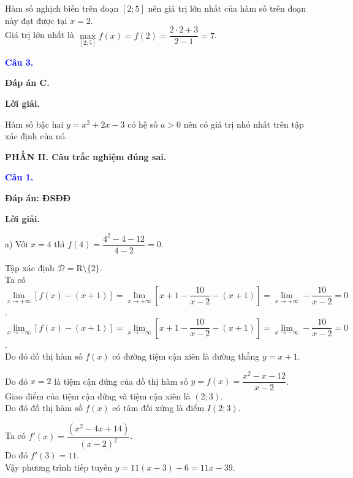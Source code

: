 \documentclass[12pt,a4paper]{article}
\begin{document}
		Hàm số nghịch biến trên đoạn $[2;5]$ nên giá trị lớn nhất của hàm số trên đoạn này đạt được tại $x=2$.\\

		Giá trị lớn nhất là $\max\limits_{[2;5]} f(x)=f(2)=\dfrac{2\cdot 2+3}{2-1}=7$.

\medskip
\noindent\textcolor{blue}{\textbf{Câu 3.}}

\noindent \textbf{Đáp án C.}

\noindent\textbf{Lời giải.}

Hàm số bậc hai $y=x^2+2x-3$ có hệ số $a>0$ nên có giá trị nhỏ nhất trên tập xác định của nó.

\medskip
\noindent\textbf{PHẦN II. Câu trắc nghiệm đúng sai.}

\medskip

\noindent\textcolor{blue}{\textbf{Câu 1.}}

\noindent \textbf{Đáp án: ĐSĐĐ}

\noindent\textbf{Lời giải.}

a)  Với $x=4$ thì $f(4)=\dfrac{4^2-4-12}{4-2}=0$.

			Tập xác định $\mathscr{D}=\mathrm{R}\setminus \{2\}$.\\

			Ta có $\lim\limits_{x\to+\infty} \left[f(x)-(x+1)\right]=\lim\limits_{x\to+\infty} \left[x+1-\dfrac{10}{x-2}-(x+1)\right]=\lim\limits_{x\to+\infty}-\dfrac{10}{x-2}=0$.\\
$\lim\limits_{x\to-\infty} \left[f(x)-(x+1)\right]=\lim\limits_{x\to-\infty} \left[x+1-\dfrac{10}{x-2}-(x+1)\right]=\lim\limits_{x\to-\infty}-\dfrac{10}{x-2}=0$.\\

			Do đó đồ thị hàm số $f(x)$ có đường tiệm cận xiên là đường thẳng $y=x+1$.

			Do đó $x=2$ là tiệm cận đứng của đồ thị hàm số $y=f(x)=\dfrac{x^2-x-12}{x-2}$.\\

			Giao điểm của tiệm cận đứng và tiệm cận xiên là $(2;3)$.\\
Do đó đồ thị hàm số $f(x)$ có tâm đối xứng là điểm $I(2; 3)$.

			Ta có $f'(x)=\dfrac{(x^2-4x+14)}{(x-2)^2}$.\\

			Do đó $f'(3)=11$.\\

			Vậy phương trình tiếp tuyến $y=11(x-3)-6=11x-39$.\\
\end{document}
